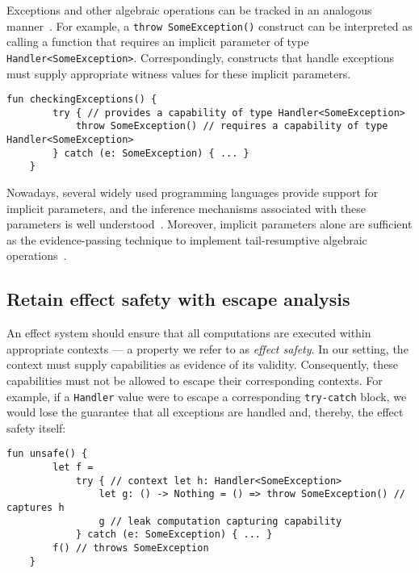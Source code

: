 \documentclass[acmsmall,review,screen]{acmart}
\begin{document}
Exceptions and other algebraic operations can be tracked in an analogous manner~\cite{odersky2021safer}.
For example, a \lstinline[language=colang]|throw SomeException()| construct can be interpreted as calling a function that requires an implicit parameter of type \lstinline[language=colang]|Handler<SomeException>|.
Correspondingly, constructs that handle exceptions must supply appropriate witness values for these implicit parameters.
\begin{lstlisting}[language=colang]
    fun checkingExceptions() {
        try { // provides a capability of type Handler<SomeException>
            throw SomeException() // requires a capability of type Handler<SomeException>
        } catch (e: SomeException) { ... }
    }
\end{lstlisting}

Nowadays, several widely used programming languages provide support for implicit parameters, and the inference mechanisms associated with these parameters is well understood~\cite{KEEP-context-parameters, oliveira2010type, lewis2000implicit}.
Moreover, implicit parameters alone are sufficient as the evidence-passing technique to implement tail-resumptive algebraic operations~\cite{xie2020effect}.

\subsection{Retain effect safety with escape analysis} \label{subsec:escape}

An effect system should ensure that all computations are executed within appropriate contexts --- a property we refer to as \textit{effect safety}.
In our setting, the context must supply capabilities as evidence of its validity.
Consequently, these capabilities must not be allowed to escape their corresponding contexts.
For example, if a \lstinline[language=colang]|Handler| value were to escape a corresponding \lstinline[language=colang]|try-catch| block, we would lose the guarantee that all exceptions are handled and, thereby, the effect safety itself:
\begin{lstlisting}[language=colang]
    fun unsafe() {
        let f =
            try { // context let h: Handler<SomeException>
                let g: () -> Nothing = () => throw SomeException() // captures h
                g // leak computation capturing capability
            } catch (e: SomeException) { ... }
        f() // throws SomeException
    }
\end{lstlisting}
\end{document}
